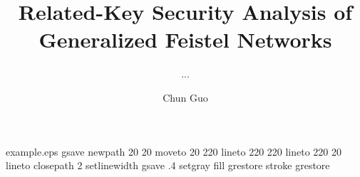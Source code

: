 \begin{filecontents*}{example.eps}
gsave
newpath
  20 20 moveto
  20 220 lineto
  220 220 lineto
  220 20 lineto
closepath
2 setlinewidth
gsave
  .4 setgray fill
grestore
stroke
grestore
\end{filecontents*}
%
\RequirePackage{fix-cm}
%
\documentclass[smallextended]{svjour3}       %
%
\smartqed  %
%


%
%

\usepackage{graphicx}
\usepackage[english]{babel}
\usepackage{blindtext}
\usepackage{algorithm}
\usepackage{algpseudocode}
\usepackage{bm}
\usepackage{multirow}
\usepackage{amsmath}
\usepackage{mathtools}
\usepackage{mathrsfs}
\usepackage{theorem}
\usepackage{amsfonts,amssymb}
\usepackage{multicol}


\usepackage{extarrows}

\usepackage[inline]{enumitem}




%




\renewcommand\theenumi{\roman{enumi}}
\renewcommand\labelenumi{(\theenumi)}


%
%



\title{Related-Key Security Analysis of Generalized Feistel Networks%
}





\author{... \and Chun Guo}



